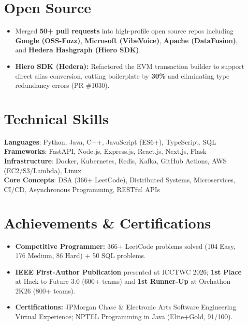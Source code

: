 \documentclass[letterpaper,11pt]{article}
\newcommand{\resumeItem}[1]{
  \item\small{
    {#1 \vspace{-2pt}}
  }
}
\newcommand{\resumeItemListStart}{\begin{itemize}}
\newcommand{\resumeItemListEnd}{\end{itemize}\vspace{-5pt}}
\begin{document}
\section{Open Source}
    \resumeItemListStart
        \resumeItem{Merged \textbf{50+ pull requests} into high-profile open source repos including \textbf{Google (OSS-Fuzz)}, \textbf{Microsoft (VibeVoice)}, \textbf{Apache (DataFusion)}, and \textbf{Hedera Hashgraph (Hiero SDK)}.}
        \resumeItem{\textbf{Hiero SDK (Hedera):} Refactored the EVM transaction builder to support direct alias conversion, cutting boilerplate by \textbf{30\%} and eliminating type redundancy errors (PR \#1030).}
    \resumeItemListEnd

\section{Technical Skills}
 \begin{itemize}[leftmargin=0.15in, label={}]
    \small{\item{
     \textbf{Languages}{: Python, Java, C++, JavaScript (ES6+), TypeScript, SQL} \\
     \textbf{Frameworks}{: FastAPI, Node.js, Express.js, React.js, Next.js, Flask} \\
     \textbf{Infrastructure}{: Docker, Kubernetes, Redis, Kafka, GitHub Actions, AWS (EC2/S3/Lambda), Linux} \\
     \textbf{Core Concepts}{: DSA (366+ LeetCode), Distributed Systems, Microservices, CI/CD, Asynchronous Programming, RESTful APIs}
    }}
  \end{itemize}

\section{Achievements \& Certifications}
  \begin{itemize}[leftmargin=0.15in, label={}]
    \resumeItem{\textbf{Competitive Programmer:} 366+ LeetCode problems solved (104 Easy, 176 Medium, 86 Hard) + 50 SQL problems.}
    \resumeItem{\textbf{IEEE First-Author Publication} presented at ICCTWC 2026; \textbf{1st Place} at Hack to Future 3.0 (600+ teams) and \textbf{1st Runner-Up} at Orchathon 2K26 (800+ teams).}
    \resumeItem{\textbf{Certifications:} JPMorgan Chase \& Electronic Arts Software Engineering Virtual Experience; NPTEL Programming in Java (Elite+Gold, 91/100).}
  \end{itemize}
\end{document}
